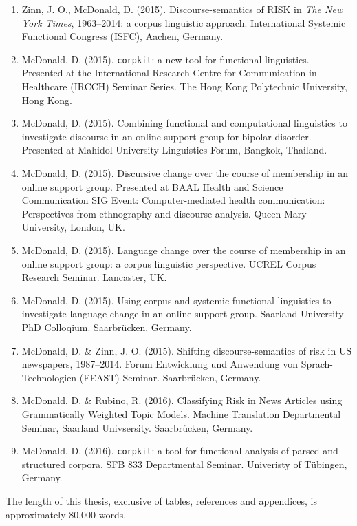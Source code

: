 \documentclass[a4paper,10pt,openright,abstract=on]{scrreprt}
\newcommand{\sctext}[1]{\small\MakeUppercase{#1}\normalsize}
\begin{document}
\begin{enumerate}
    \item Zinn, J. O., McDonald, D. (2015). Discourse\hyp{}semantics of \sctext{risk} in \emph{The New York Times}, 1963--2014: a corpus linguistic approach. International Systemic Functional Congress (ISFC), Aachen, Germany.
    \item McDonald, D. (2015). \texttt{corpkit}: a new tool for functional linguistics. Presented at the International Research Centre for Communication in Healthcare (IRCCH) Seminar Series. The Hong Kong Polytechnic University, Hong Kong.
    \item McDonald, D. (2015). Combining functional and computational linguistics to investigate discourse in an online support group for bipolar disorder. Presented at Mahidol University Linguistics Forum, Bangkok, Thailand.
    \item McDonald, D. (2015). Discursive change over the course of membership in an online support group. Presented at BAAL Health and Science Communication SIG Event: Computer-mediated health communication: Perspectives from ethnography and discourse analysis. Queen Mary University, London, UK.
    \item McDonald, D. (2015). Language change over the course of membership in an online support group: a corpus linguistic perspective. UCREL Corpus Research Seminar. Lancaster, UK.
    \item McDonald, D. (2015). Using corpus and systemic functional linguistics to investigate language change in an online support group. Saarland University PhD Colloqium. Saarbr{\"u}cken, Germany.
    \item McDonald, D. \& Zinn, J. O. (2015). Shifting discourse\hyp{}semantics of risk in US newspapers, 1987--2014. Forum Entwicklung und Anwendung von Sprach-Technologien (FEAST) Seminar. Saarbr{\"u}cken, Germany.
    \item McDonald, D. \& Rubino, R. (2016). Classifying Risk in News Articles using Grammatically Weighted Topic Models. Machine Translation Departmental Seminar, Saarland Univsersity. Saarbr{\"u}cken, Germany.
    \item McDonald, D. (2016). \texttt{corpkit}: a tool for functional analysis of parsed and structured corpora. SFB 833 Departmental Seminar. Univeristy of T{\"u}bingen, Germany.
\end{enumerate}

\clearpage

\noindent The length of this thesis, exclusive of tables, references and appendices, is approximately 80,000 words. ~\\~\\
\end{document}
